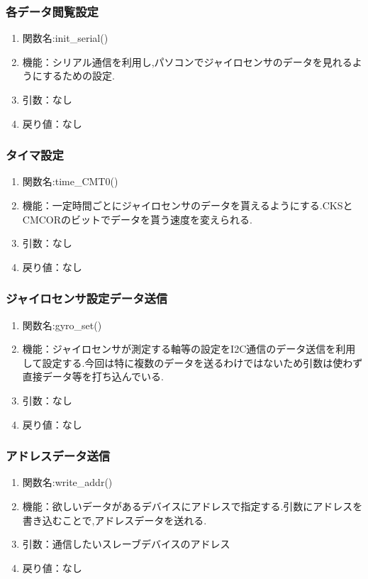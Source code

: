 \documentclass[12pt,oneside]{paper}
\begin{document}
\subsubsection{各データ閲覧設定}

\begin{enumerate}
\item 関数名:init\_serial()
\item 機能：シリアル通信を利用し,パソコンでジャイロセンサのデータを見れるようにするための設定.
\item 引数：なし
\item 戻り値：なし
\end{enumerate}

\subsubsection{タイマ設定}

\begin{enumerate}
\item 関数名:time\_CMT0()
\item 機能：一定時間ごとにジャイロセンサのデータを貰えるようにする.CKSとCMCORのビットでデータを貰う速度を変えられる.
\item 引数：なし
\item 戻り値：なし
\end{enumerate}

\subsubsection{ジャイロセンサ設定データ送信}

\begin{enumerate}
\item 関数名:gyro\_set()
\item 機能：ジャイロセンサが測定する軸等の設定をI2C通信のデータ送信を利用して設定する.今回は特に複数のデータを送るわけではないため引数は使わず直接データ等を打ち込んでいる.
\item 引数：なし
\item 戻り値：なし
\end{enumerate}

\subsubsection{アドレスデータ送信}

\begin{enumerate}
\item 関数名:write\_addr()
\item 機能：欲しいデータがあるデバイスにアドレスで指定する.引数にアドレスを書き込むことで,アドレスデータを送れる.
\item 引数：通信したいスレーブデバイスのアドレス
\item 戻り値：なし
\end{enumerate}
\end{document}
